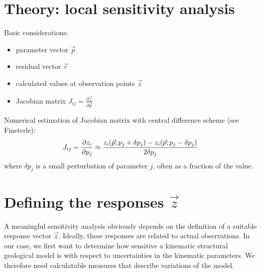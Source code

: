 \documentclass[a4paper,10pt,english]{sphinxmanual}
\begin{document}
\section{Theory: local sensitivity analysis}
\label{notebooks/8-Sensitivity-Analysis:theory-local-sensitivity-analysis}
Basic considerations:
\begin{itemize}
\item {} 
parameter vector \(\vec{p}\)

\item {} 
residual vector \(\vec{r}\)

\item {} 
calculated values at observation points \(\vec{z}\)

\item {} 
Jacobian matrix
\(J_{ij} = \frac{\partial \vec{z}}{\partial \vec{p}}\)

\end{itemize}

Numerical estimation of Jacobian matrix with central difference scheme
(see Finsterle):
\begin{gather}
\begin{split}J_{ij} = \frac{\partial z_i}{\partial p_j} \approx \frac{z_i(\vec{p}; p_j + \delta p_j) - z_i(\vec{p};p_j - \delta p_j)}{2 \delta p_j}\end{split}\notag
\end{gather}
where \(\delta p_j\) is a small perturbation of parameter \(j\),
often as a fraction of the value.


\section{Defining the responses \(\vec{z}\)}
\label{notebooks/8-Sensitivity-Analysis:defining-the-responses}
A meaningful sensitivity analysis obviously depends on the definition of
a suitable response vector \(\vec{z}\). Ideally, these responses are
related to actual observations. In our case, we first want to determine
how sensitive a kinematic structural geological model is with respect to
uncertainties in the kinematic parameters. We therefore need
calculatable measures that describe variations of the model.
\end{document}
